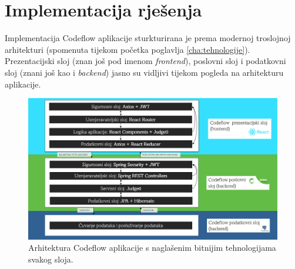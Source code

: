 \documentclass[times, utf8, zavrsni]{fer}
\begin{document}
		\section{Implementacija rješenja}
		Implementacija Codeflow aplikacije sturkturirana je prema modernoj troslojnoj arhitekturi (spomenuta tijekom početka poglavlja \ref{cha:tehnologije}). Prezentacijski sloj (znan još pod imenom \textit{frontend}), poslovni sloj i podatkovni sloj (znani još kao i \textit{backend}) jasno su vidljivi tijekom pogleda na arhitekturu aplikacije.
		\begin{figure}[H]
			\centering
			\includegraphics[width=\linewidth]{pictures/prikazi/Arhitektura.png}
			\caption{Arhitektura Codeflow aplikacije s naglašenim bitnijim tehnologijama svakog sloja.}
			\label{fig:arh}
		\end{figure}
	
\end{document}
